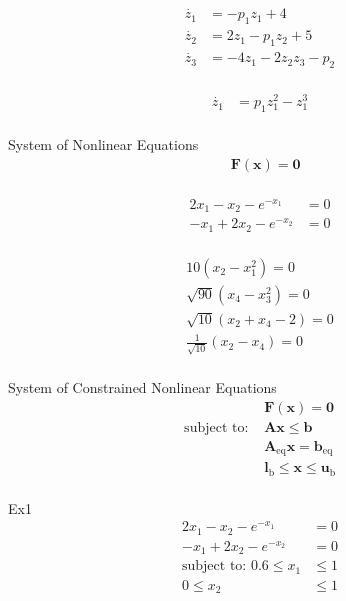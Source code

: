 \documentclass{article}
\begin{document}
\begin{align*}
\dot{z_1} &= -p_1z_1 + 4\\
\dot{z_2} &= 2z_1 - p_1z_2 + 5\\
\dot{z_3} &= -4z_1 - 2z_2z_3 - p_2\\
\end{align*}

\begin{align*}
\dot{z_1} &= p_1z_1^2 - z_1^3\\
\end{align*}


System of Nonlinear Equations
\begin{align*}
     & \mathbf{F} \left( \mathbf{x} \right) = \mathbf{0} \\
\end{align*}

\begin{align*}
    2x_1 - x_2 - e^{-x_1} &= 0\\
    -x_1 + 2x_2 - e^{-x_2} &= 0\\
\end{align*}

\begin{align*}
    10 \left(x_2 - x_1^2 \right) = 0\\
    \sqrt{90} \left(x_4 - x_3^2 \right) = 0\\
    \sqrt{10} \left(x_2 + x_4 - 2 \right) = 0\\
    \frac{1}{\sqrt{10}} \left(x_2 - x_4 \right) = 0\\
\end{align*}

System of Constrained Nonlinear Equations
\begin{align*}
    & \mathbf{F} \left( \mathbf{x} \right) = \mathbf{0} \\
    \mbox{subject to: }& \mathbf{A}\mathbf{x} \le \mathbf{b}\\
                       & \mathbf{A}_{\text{eq}}\mathbf{x} = \mathbf{b}_{\text{eq}}\\
                       & \mathbf{l}_{\text{b}} \le \mathbf{x} \le \mathbf{u}_{\text{b}}\\
\end{align*}

Ex1
\begin{align*}
2x_1 - x_2 - e^{-x_1} &= 0\\
-x_1 + 2x_2 - e^{-x_2} &= 0\\
\mbox{subject to: } 0.6 \le x_1 &\le 1\\
                    0 \le x_2 &\le 1\\
\end{align*}
\end{document}
